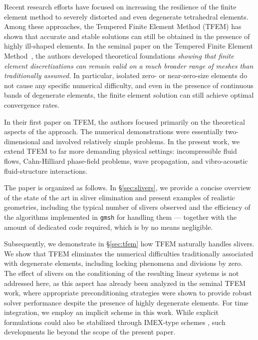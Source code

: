 \documentclass{article}
\begin{document}
Recent research efforts have focused on increasing the resilience of the finite element method to severely distorted and even degenerate tetrahedral elements.  Among these approaches, the Tempered Finite Element Method (TFEM) has shown that accurate and stable solutions can still be obtained in the presence of highly ill-shaped elements.
In the seminal paper on the Tempered Finite Element Method~\cite{quiriny2024tempered}, the authors developed theoretical foundations \emph{showing that finite element discretizations can remain valid on a much broader range of meshes than traditionally assumed.}
In particular, isolated zero- or near-zero-size elements do not cause any specific numerical difficulty, and even in the presence of continuous bands of degenerate elements, the finite element solution can still achieve optimal convergence rates.

In their first paper on TFEM, the authors focused primarily on the theoretical aspects of the approach.  The numerical demonstrations were essentially two-dimensional and involved relatively simple problems.  In the present work, we extend TFEM to far more demanding physical settings: incompressible fluid flows, Cahn-Hilliard phase-field problems, wave propagation, and vibro-acoustic fluid-structure interactions.

The paper is organized as follows.
In \S\ref{sec:slivers}, we provide a concise overview of the state of the art in sliver elimination and present examples of realistic geometries, including the typical number of slivers observed and the efficiency of the algorithms implemented in \texttt{gmsh} \cite{geuzaine2009gmsh} for handling them — together with the amount of dedicated code required, which is by no means negligible.

Subsequently, we demonstrate in \S\ref{sec:tfem} how TFEM naturally handles slivers.
We show that TFEM eliminates the numerical difficulties traditionally associated
with degenerate elements, including locking phenomena and divisions by zero.
The effect of slivers on the conditioning of the resulting linear systems is not
addressed here, as this aspect has already been analyzed in the seminal TFEM
work, where appropriate preconditioning strategies were shown to provide robust
solver performance despite the presence of highly degenerate elements.
For time integration, we employ an implicit scheme in this work. While
explicit formulations could also be stabilized through IMEX-type schemes \cite{ASCHER1997151}, such
developments lie beyond the scope of the present paper.
\end{document}
